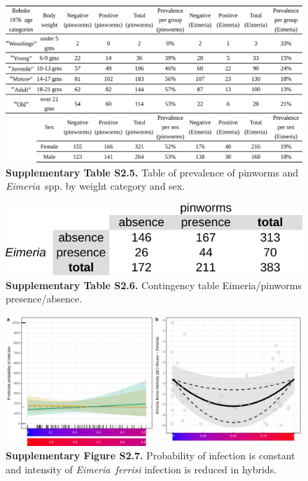 \begin{figure}[H]
	\centering
	\includegraphics[width=\linewidth,height=\textheight,keepaspectratio]{images/2article1/SupplementaryTableS5.pdf}
	\captionsetup{labelformat=empty}
	\caption{\textbf{Supplementary Table S2.5.} Table of prevalence of pinworms and \textit{Eimeria}~spp. by weight category and sex.}
\end{figure}

\vspace{2cm}

\begin{figure}[H]
	\centering
	\includegraphics[width=\linewidth,height=\textheight,keepaspectratio]{images/2article1/SupplementaryTableS6.pdf}
	\captionsetup{labelformat=empty}
	\caption{\textbf{Supplementary Table S2.6.}  Contingency table Eimeria/pinworms presence/absence.}
\end{figure}

\newpage

\begin{figure}[H]
	\centering
	\includegraphics[width=\linewidth,height=\textheight,keepaspectratio]{images/2article1/SupplementaryFigureS7.pdf}
	\captionsetup{labelformat=empty}
	\caption{\textbf{Supplementary Figure S2.7.} Probability of infection is constant and intensity of \textit{Eimeria~ferrisi} infection is reduced in hybrids.}
\end{figure}

